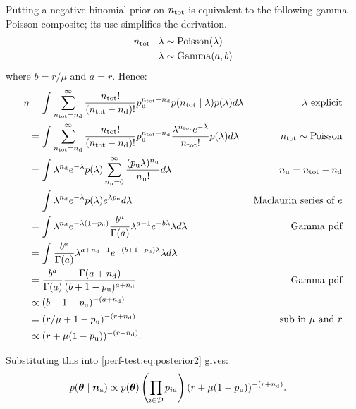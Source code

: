 \documentclass[thesis.tex]{subfiles}
\begin{document}
Putting a negative binomial prior on $n_\text{tot}$ is equivalent to the following gamma-Poisson composite; its use simplifies the derivation.
\begin{align}
n_\text{tot} \mid \lambda &\sim \operatorname{Poisson}(\lambda) \\
\lambda &\sim \operatorname{Gamma}(a, b)
\end{align}
where $b = r / \mu$ and $a = r$.
Hence:
\begin{align}
\eta
&= \int \sum_{n_\text{tot}=n_\text{d}}^\infty \frac{n_\text{tot}!}{(n_\text{tot}-n_\text{d})!} p_\text{u}^{n_\text{tot}-n_\text{d}} p(n_\text{tot} \mid \lambda) p(\lambda) d\lambda &\text{$\lambda$ explicit}\\
&= \int \sum_{n_\text{tot}=n_\text{d}}^\infty \frac{n_\text{tot}!}{(n_\text{tot}-n_\text{d})!} p_\text{u}^{n_\text{tot}-n_\text{d}} \frac{\lambda^{n_\text{tot}} e^{-\lambda}}{n_\text{tot}!} p(\lambda) d\lambda &n_\text{tot} \sim \operatorname{Poisson}\\
&= \int \lambda^{n_\text{d}} e^{-\lambda} p(\lambda) \sum_{n_\text{u}=0}^\infty \frac{(p_\text{u} \lambda)^{n_\text{u}}}{n_\text{u}!} d\lambda &n_\text{u} = n_\text{tot}-n_\text{d}\\
&= \int \lambda^{n_\text{d}} e^{-\lambda} p(\lambda) e^{\lambda p_\text{u}} d\lambda &\text{Maclaurin series of $e$} \\
&= \int \lambda^{n_\text{d}} e^{-\lambda(1 - p_\text{u})} \frac{b^a}{\Gamma(a)} \lambda^{a-1} e^{-b\lambda} \lambda d\lambda &\text{Gamma pdf}\\
&= \int \frac{b^a}{\Gamma(a)} \lambda^{a+n_\text{d}-1} e^{-(b+1-p_\text{u})\lambda} \lambda d\lambda \\
&= \frac{b^a}{\Gamma(a)} \frac{\Gamma(a+n_\text{d})}{(b+1-p_\text{u})^{a+n_\text{d}}} &\text{Gamma pdf}\\
&\propto (b+1-p_\text{u})^{-(a+n_\text{d})} \\
&= (r/\mu + 1 - p_\text{u})^{-(r+n_\text{d})} &\text{sub in $\mu$ and $r$}\\
&\propto(r + \mu (1- p_\text{u}))^{-(r+n_\text{d})}.
\end{align}

Substituting this into \cref{perf-test:eq:posterior2} gives:
\begin{align}
p(\bm{\theta} \mid \bm{n}_\text{a})
&\propto p(\bm{\theta}) \left( \prod_{i \in \mathcal{D}} p_{ia} \right) (r + \mu (1- p_\text{u}))^{-(r+n_\text{d})} \label{perf-test:eq:full-posterior}.
\end{align}
\end{document}

